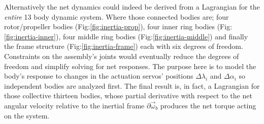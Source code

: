 \par
Alternatively the net dynamics could indeed be derived from a Lagrangian for the \emph{entire} 13 body dynamic system. Where those connected bodies are; four rotor/propeller bodies (Fig:\ref{fig:inertia-prop}), four inner ring bodies (Fig:\ref{fig:inertia-inner}), four middle ring bodies (Fig:\ref{fig:inertia-middle}) and finally the frame structure (Fig:\ref{fig:inertia-frame}) each with six degrees of freedom. Constraints on the assembly's joints would eventually reduce the degrees of freedom and simplify solving for net responses. The purpose here is to model the body's response to changes in the actuation servos' positions $\Delta\lambda_i$ and $\Delta\alpha_i$ so independent bodies are analyzed first. The final result is, in fact, a Lagrangian for those collective thirteen bodies, whose partial derivative with respect to the net angular velocity relative to the inertial frame $\partial\vec{\omega}_b$ produces the net torque acting on the system.

